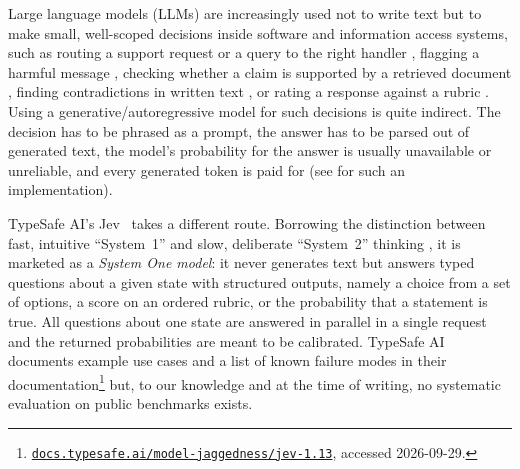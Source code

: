 \documentclass[table]{article}
\begin{document}
Large language models (LLMs) are increasingly used not to write text but to make small, well-scoped decisions inside software and information access systems, such as routing a support request or a query to the right handler \cite{liu2025tickit}, flagging a harmful message \cite{inan2023llamaguardllmbasedinputoutput}, checking whether a claim is supported by a retrieved document \cite{tang-etal-2024-minicheck}, finding contradictions in written text \cite{deusser2023uncovering}, or rating a response against a rubric \cite{kim2024prometheus}. Using a generative/autoregressive model for such decisions is quite indirect. The decision has to be phrased as a prompt, the answer has to be parsed out of generated text, the model's probability for the answer is usually unavailable or unreliable, and every generated token is paid for (see  for such an implementation).

TypeSafe AI's Jev~\cite{typesafe2026jev} takes a different route. Borrowing the distinction between fast, intuitive ``System~1'' and slow, deliberate ``System~2'' thinking \cite{kahneman2011thinking}, it is marketed as a \emph{System One model}: it never generates text but answers typed questions about a given state with structured outputs, namely a choice from a set of options, a score on an ordered rubric, or the probability that a statement is true. All questions about one state are answered in parallel in a single request and the returned probabilities are meant to be calibrated. TypeSafe AI documents example use cases and a list of known failure modes in their documentation\footnote{\href{https://docs.typesafe.ai/model-jaggedness/jev-1.13}{\texttt{docs.typesafe.ai/model-jaggedness/jev-1.13}}, accessed 2026-09-29.} but, to our knowledge and at the time of writing, no systematic evaluation on public benchmarks exists. 
\end{document}
